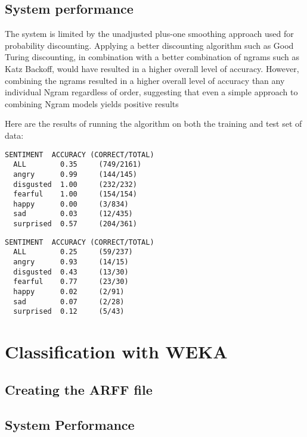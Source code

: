 \documentclass[a4paper,oneside]{article}
\begin{document}
\subsection{System performance}

The system is limited by the unadjusted plus-one smoothing approach used for
probability discounting. Applying a better discounting algorithm such as Good
Turing discounting, in combination with a better combination of ngrams such as
Katz Backoff, would have resulted in a higher overall level of accuracy.
However, combining the ngrams resulted in a higher overall level of accuracy
than any individual Ngram regardless of order, suggesting that even a simple
approach to combining Ngram models yields positive results

Here are the results of running the algorithm on both the training and test set
of data:

\begin{lstlisting}[caption=Training Set]
  SENTIMENT  ACCURACY (CORRECT/TOTAL)
  ALL        0.35     (749/2161)
  angry      0.99     (144/145)
  disgusted  1.00     (232/232)
  fearful    1.00     (154/154)
  happy      0.00     (3/834)
  sad        0.03     (12/435)
  surprised  0.57     (204/361)
\end{lstlisting}

\begin{lstlisting}[caption=Test Set]
  SENTIMENT  ACCURACY (CORRECT/TOTAL)
  ALL        0.25     (59/237)
  angry      0.93     (14/15)
  disgusted  0.43     (13/30)
  fearful    0.77     (23/30)
  happy      0.02     (2/91)
  sad        0.07     (2/28)
  surprised  0.12     (5/43)
\end{lstlisting}

\section{Classification with WEKA}

\subsection{Creating the ARFF file}

\subsection{System Performance}
\end{document}

